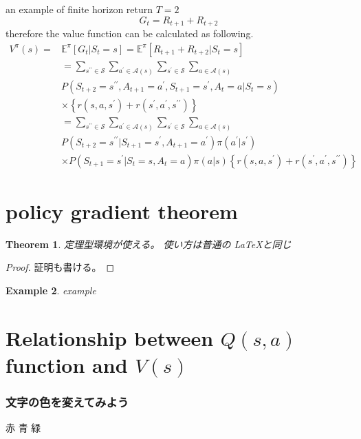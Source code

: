 \documentclass[dvipdfmx,cjk]{beamer}
\newtheorem{thm}{Theorem}[section]
\theoremstyle{example}
\newtheorem{exam}[thm]{Example}
\begin{document}
\begin{frame}
an example of finite horizon return $T=2$
    \begin{equation}
        G_t = R_{t+1} + R_{t+2}
    \end{equation}
therefore the value function can be calculated as following.
\begin{align*}
V^{\pi} ( s ) = & \mathbb { E } ^ { \pi } \left[ G _ { t } | S _ { t } = s \right] = \mathbb { E } ^ { \pi } \left[ R _ { t + 1 } + R _ { t + 2 } | S _ { t } = s \right] \nonumber\\ 
    & = \sum _ { s ^ { \prime \prime } \in \mathcal { S } } \sum _ { a ^ { \prime } \in \mathcal { A } ( s ) } \sum _ { s ^ { \prime } \in \mathcal { S } } \sum _ { a \in \mathcal { A } ( s ) } \nonumber \\
    & P \left( S _ { t + 2 } = s ^ { \prime \prime } , A _ { t + 1 } = a ^ { \prime } , S _ { t + 1 } = s ^ { \prime } , A _ { t } = a | S _ { t } = s \right) \nonumber\\ 
    & \times \left\{ r \left( s , a , s ^ { \prime } \right) + r \left( s ^ { \prime } , a ^ { \prime } , s ^ { \prime \prime } \right) \right\} \nonumber\\ 
    & = \sum _ { s ^ { \prime \prime } \in \mathcal { S } } \sum _ { a ^ { \prime } \in \mathcal { A } ( s ) } \sum _ { s ^ { \prime } \in \mathcal { S } } \sum _ { a \in \mathcal { A } ( s ) } \nonumber\\
    & P \left( S _ { t + 2 } = s ^ { \prime \prime } | S _ { t + 1 } = s ^ { \prime } , A _ { t + 1 } = a ^ { \prime } \right) \pi \left( a ^ { \prime } | s ^ { \prime } \right) \nonumber\\ 
    &\times P \left( S _ { t + 1 } = s ^ { \prime } | S _ { t } = s , A _ { t } = a \right) \pi ( a | s ) \left\{ r \left( s , a , s ^ { \prime } \right) + r \left( s ^ { \prime } , a ^ { \prime } , s ^ { \prime \prime } \right) \right\}
\end{align*}
\end{frame}

\section{policy gradient theorem}           %
\begin{frame}                  %
\begin{thm}
定理型環境が使える。
使い方は普通の \LaTeX と同じ
\end{thm}
\pause

\begin{proof}
証明も書ける。
\end{proof}
\pause

\begin{exam}                   %
example
\end{exam}
\end{frame}

\section{Relationship between $Q(s,a)$ function and $V(s)$}             %
\begin{frame}
\frametitle{文字の色を変えてみよう}
{\color{red}赤}\pause
{\color{blue}青}\pause
{\color{green}緑}
\end{frame}
\end{document}
